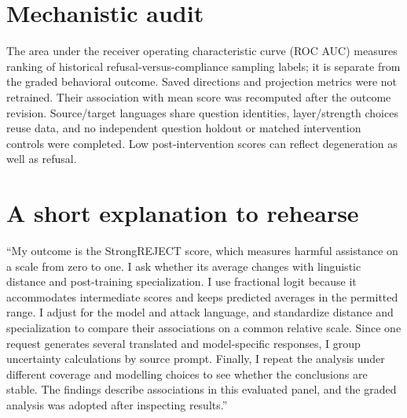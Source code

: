 \section*{Mechanistic audit}
The area under the receiver operating characteristic curve (ROC AUC) measures ranking of historical refusal-versus-compliance sampling labels; it is separate from the graded behavioral outcome. Saved directions and projection metrics were not retrained. Their association with mean score was recomputed after the outcome revision. Source/target languages share question identities, layer/strength choices reuse data, and no independent question holdout or matched intervention controls were completed. Low post-intervention scores can reflect degeneration as well as refusal.

\section*{A short explanation to rehearse}
``My outcome is the StrongREJECT score, which measures harmful assistance on a scale from zero to one. I ask whether its average changes with linguistic distance and post-training specialization. I use fractional logit because it accommodates intermediate scores and keeps predicted averages in the permitted range. I adjust for the model and attack language, and standardize distance and specialization to compare their associations on a common relative scale. Since one request generates several translated and model-specific responses, I group uncertainty calculations by source prompt. Finally, I repeat the analysis under different coverage and modelling choices to see whether the conclusions are stable. The findings describe associations in this evaluated panel, and the graded analysis was adopted after inspecting results.''

